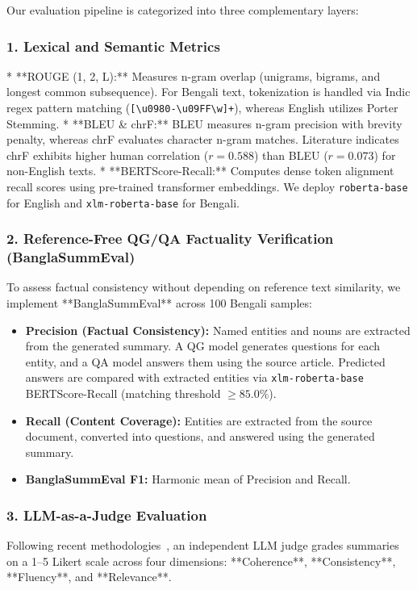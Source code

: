 \documentclass[runningheads]{llncs}
\begin{document}
Our evaluation pipeline is categorized into three complementary layers:

\subsubsection{1. Lexical and Semantic Metrics}
* **ROUGE (1, 2, L):** Measures n-gram overlap (unigrams, bigrams, and longest common subsequence). For Bengali text, tokenization is handled via Indic regex pattern matching (\texttt{[\textbackslash u0980-\textbackslash u09FF\textbackslash w]+}), whereas English utilizes Porter Stemming.
* **BLEU \& chrF:** BLEU measures n-gram precision with brevity penalty, whereas chrF evaluates character n-gram matches. Literature indicates chrF exhibits higher human correlation ($r = 0.588$) than BLEU ($r = 0.073$) for non-English texts.
* **BERTScore-Recall:** Computes dense token alignment recall scores using pre-trained transformer embeddings. We deploy \texttt{roberta-base} for English and \texttt{xlm-roberta-base} for Bengali.

\subsubsection{2. Reference-Free QG/QA Factuality Verification (BanglaSummEval)}
To assess factual consistency without depending on reference text similarity, we implement **BanglaSummEval** across 100 Bengali samples:
\begin{itemize}
    \item \textbf{Precision (Factual Consistency):} Named entities and nouns are extracted from the generated summary. A QG model generates questions for each entity, and a QA model answers them using the source article. Predicted answers are compared with extracted entities via \texttt{xlm-roberta-base} BERTScore-Recall (matching threshold $\ge 85.0\%$).
    \item \textbf{Recall (Content Coverage):} Entities are extracted from the source document, converted into questions, and answered using the generated summary.
    \item \textbf{BanglaSummEval F1:} Harmonic mean of Precision and Recall.
\end{itemize}

\subsubsection{3. LLM-as-a-Judge Evaluation}
Following recent methodologies~\cite{zheng2023}, an independent LLM judge grades summaries on a 1--5 Likert scale across four dimensions: **Coherence**, **Consistency**, **Fluency**, and **Relevance**.
\end{document}
